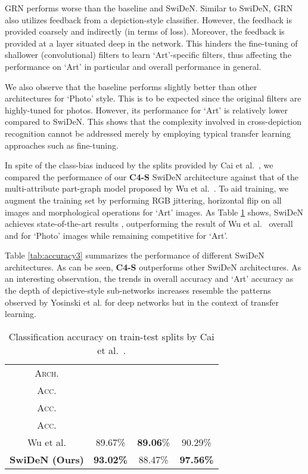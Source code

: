 \documentclass[preprint]{sig-alternate-05-2015}
\begin{document}
GRN performs worse than the baseline and SwiDeN. Similar to SwiDeN, GRN also utilizes feedback from a depiction-style classifier. However, the feedback is provided coarsely and indirectly (in terms of loss). Moreover, the feedback is provided at a layer situated deep in the network. This hinders the fine-tuning of shallower (convolutional) filters to learn `Art'-specific filters, thus affecting the performance on `Art' in particular and overall performance in general.

We also observe that the baseline performs slightly better than other architectures for `Photo' style. This is to be expected since the original filters are highly-tuned for photos. However, its performance for `Art' is relatively lower compared to SwiDeN. This shows that the complexity involved in cross-depiction recognition cannot be addressed merely by employing typical transfer learning approaches such as fine-tuning.

In spite of the class-bias induced by the splits provided by Cai et al.~\cite{cai2015cross}, we compared the performance of our \textbf{C4-S} SwiDeN architecture against that of the multi-attribute part-graph model proposed by Wu et al.~\cite{wu2014learning}. To aid training, we augment the training set by performing RGB jittering, horizontal flip on all images and morphological operations for `Art' images. As Table \ref{tab:accuracy2} shows, SwiDeN achieves state-of-the-art results , outperforming the result of Wu et al.~\cite{wu2014learning} overall and for `Photo' images while remaining competitive for `Art'.

Table \ref{tab:accuracy3} summarizes the performance of different SwiDeN architectures. As can be seen, \textbf{C4-S} outperforms other SwiDeN architectures. As an interesting observation, the trends in overall accuracy and `Art' accuracy  as the depth of depictive-style sub-networks increases resemble the patterns observed by Yosinski et al.\cite{yosinski2014transferable} for deep networks but in the context of transfer learning. 

\renewcommand{\arraystretch}{1.5}
\begin{table}[!tbp]
\centering
\footnotesize
\begin{tabular}{|c|c|c|c|}
\hline
\textsc{Arch.} & \thead{\textsc{Overall} \\ \textsc{Acc.}} & \thead{\textsc{Art} \\ \textsc{Acc.}} & \thead{\textsc{Photo} \\ \textsc{Acc.}} \\
\hline
\hline 
Wu et al.\cite{wu2014learning} & 89.67\% & \textbf{89.06}\%  & 90.29\% \\
\hline
\textbf{SwiDeN (Ours)} & \textbf{93.02\%} & 88.47\% & \textbf{97.56\%} \\
\hline
\end{tabular}
\caption{Classification accuracy on train-test splits by Cai et al.~\cite{cai2015cross}.}
\label{tab:accuracy2}
\end{table}
\end{document}
